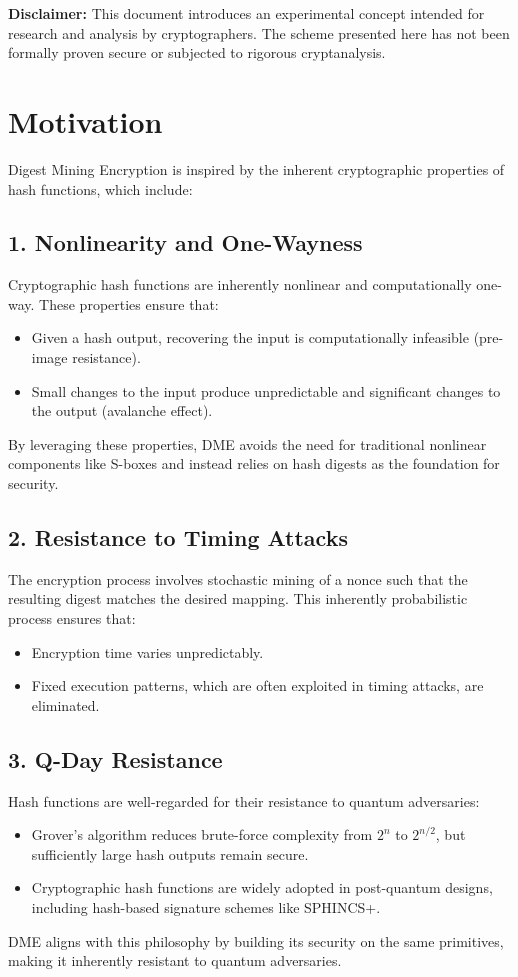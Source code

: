 \documentclass[11pt,a4paper]{article}
\begin{document}
\textbf{Disclaimer:} This document introduces an experimental concept intended for research and analysis by cryptographers. The scheme presented here has not been formally proven secure or subjected to rigorous cryptanalysis.

\section*{Motivation}
Digest Mining Encryption is inspired by the inherent cryptographic properties of hash functions, which include:

\subsection*{1. Nonlinearity and One-Wayness}
Cryptographic hash functions are inherently nonlinear and computationally one-way. These properties ensure that:
\begin{itemize}
  \item Given a hash output, recovering the input is computationally infeasible (pre-image resistance).
  \item Small changes to the input produce unpredictable and significant changes to the output (avalanche effect).
\end{itemize}
By leveraging these properties, DME avoids the need for traditional nonlinear components like S-boxes and instead relies on hash digests as the foundation for security.

\subsection*{2. Resistance to Timing Attacks}
The encryption process involves stochastic mining of a nonce such that the resulting digest matches the desired mapping. This inherently probabilistic process ensures that:
\begin{itemize}
  \item Encryption time varies unpredictably.
  \item Fixed execution patterns, which are often exploited in timing attacks, are eliminated.
\end{itemize}

\subsection*{3. Q-Day Resistance}
Hash functions are well-regarded for their resistance to quantum adversaries:
\begin{itemize}
  \item Grover's algorithm reduces brute-force complexity from \( 2^n \) to \( 2^{n/2} \), but sufficiently large hash outputs remain secure.
  \item Cryptographic hash functions are widely adopted in post-quantum designs, including hash-based signature schemes like SPHINCS+.
\end{itemize}
DME aligns with this philosophy by building its security on the same primitives, making it inherently resistant to quantum adversaries.
\end{document}

